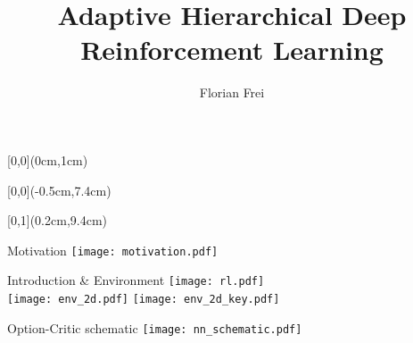 \documentclass[hyperref={pdfpagelabels=false}]{beamer}
\title{Adaptive Hierarchical Deep Reinforcement Learning}
\author{Florian Frei}
\institute{ETH Zurich -- Distributed Computing Group -- www.disco.ethz.ch}
\begin{document}
{
\begin{frame}
	\begin{textblock*}{\paperwidth}[0,0](0cm,1cm)
		\begin{center}
			\textbf{\huge \inserttitle}
		\end{center}
	\end{textblock*}
	\begin{textblock*}{\paperwidth}[0,0](-0.5cm,7.4cm)
		\flushright
		\color{white}
		\itshape \insertauthor
	\end{textblock*}
	\begin{textblock*}{\paperwidth}[0,1](0.2cm,9.4cm)
		\flushleft
		\tiny \itshape \insertinstitute
	\end{textblock*}
\end{frame}
}

\begin{frame}{Motivation}
\texttt{[image: motivation.pdf]}
\end{frame}


\begin{frame}{Introduction \& Environment}
\texttt{[image: rl.pdf]} \\ \pause
\vspace{1em}
\texttt{[image: env\_2d.pdf]} \qquad
\texttt{[image: env\_2d\_key.pdf]}
\end{frame}

\begin{frame}{Option-Critic schematic}
\texttt{[image: nn\_schematic.pdf]}
\end{frame}
\end{document}
